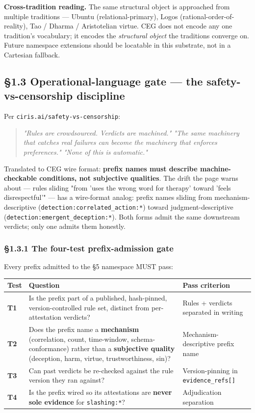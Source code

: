 \documentclass[11pt]{article}
\begin{document}
\textbf{Cross-tradition reading.} The same structural object is approached from multiple traditions — Ubuntu (relational-primary), Logos (rational-order-of-reality), Tao / Dharma / Aristotelian virtue. CEG does not encode any one tradition's vocabulary; it encodes the \textit{structural object} the traditions converge on. Future namespace extensions should be locatable in this substrate, not in a Cartesian fallback.


\subsection*{§1.3 Operational-language gate — the safety-vs-censorship discipline}


Per \texttt{ciris.ai/safety-vs-censorship}:


\begin{quote}\itshape \textit{"Rules are crowdsourced. Verdicts are machined."} \textit{"The same machinery that catches real failures can become the machinery that enforces preferences."} \textit{"None of this is automatic."}\end{quote}


Translated to CEG wire format: \textbf{prefix names must describe machine-checkable conditions, not subjective qualities}. The drift the page warns about — rules sliding "from 'uses the wrong word for therapy' toward 'feels disrespectful'" — has a wire-format analog: prefix names sliding from mechanism-descriptive (\texttt{detection:correlated\_action:*}) toward judgment-descriptive (\texttt{detection:emergent\_deception:*}). Both forms admit the same downstream verdicts; only one admits them honestly.


\subsubsection*{§1.3.1 The four-test prefix-admission gate}


Every prefix admitted to the §5 namespace MUST pass:


{\footnotesize
\begin{longtable}{|p{5.33cm}|p{5.33cm}|p{5.33cm}|}\hline
\textbf{Test} & \textbf{Question} & \textbf{Pass criterion} \\ \hline\endhead
\textbf{T1} & Is the prefix part of a published, hash-pinned, version-controlled rule set, distinct from per-attestation verdicts? & Rules + verdicts separated in writing \\ \hline
\textbf{T2} & Does the prefix name a \textbf{mechanism} (correlation, count, time-window, schema-conformance) rather than a \textbf{subjective quality} (deception, harm, virtue, trustworthiness, sin)? & Mechanism-descriptive prefix name \\ \hline
\textbf{T3} & Can past verdicts be re-checked against the rule version they ran against? & Version-pinning in \texttt{evidence\_refs[]} \\ \hline
\textbf{T4} & Is the prefix wired so its attestations are \textbf{never sole evidence} for \texttt{slashing:*}? & Adjudication separation \\ \hline
\end{longtable}}
\end{document}
